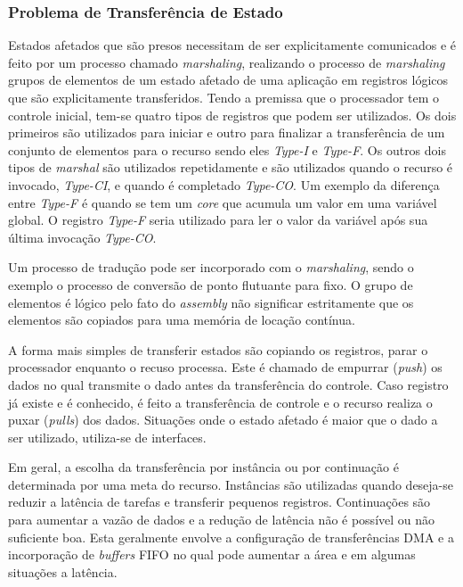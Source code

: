 \subsubsection{Problema de Transferência de Estado}

Estados afetados que são presos necessitam de ser explicitamente comunicados e é feito por um processo chamado \textit{marshaling}, realizando o processo de \textit{marshaling} grupos de elementos de um estado afetado de uma aplicação em registros lógicos que são explicitamente transferidos. Tendo a premissa que o processador tem o controle inicial, tem-se quatro tipos de registros que podem ser utilizados. Os dois primeiros são utilizados para iniciar e outro para finalizar a transferência de um conjunto de elementos para o recurso sendo eles \textit{Type-I} e \textit{Type-F}. Os outros dois tipos de \textit{marshal} são utilizados repetidamente e são utilizados quando o recurso é invocado, \textit{Type-CI}, e quando é completado \textit{Type-CO}. Um exemplo da diferença entre \textit{Type-F} é quando se tem um \textit{core} que acumula um valor em uma variável global. O registro \textit{Type-F} seria utilizado para ler o valor da variável após sua última invocação \textit{Type-CO}.



Um processo de tradução pode ser incorporado com o \textit{marshaling}, sendo o exemplo o processo de conversão de ponto flutuante para fixo. O grupo de elementos é lógico pelo fato do \textit{assembly} não significar estritamente que os elementos são copiados para uma memória de locação contínua. 



A forma mais simples de transferir estados são copiando os registros, parar o processador enquanto o recuso processa. Este é chamado de empurrar (\textit{push}) os dados no qual transmite o dado antes da transferência do controle. Caso registro já existe e é conhecido, é feito a transferência de controle e o recurso realiza o puxar (\textit{pulls}) dos dados. Situações onde o estado afetado é maior que o dado a ser utilizado, utiliza-se de interfaces.



Em geral, a escolha da transferência por instância ou por continuação é determinada por uma meta do recurso. Instâncias são utilizadas quando deseja-se reduzir a latência de tarefas e transferir pequenos registros. Continuações são para aumentar a vazão de dados e a redução de latência não é possível ou não suficiente boa. Esta geralmente envolve a configuração de transferências DMA e a incorporação de \textit{buffers} FIFO no qual pode aumentar a área e em algumas situações a latência.



